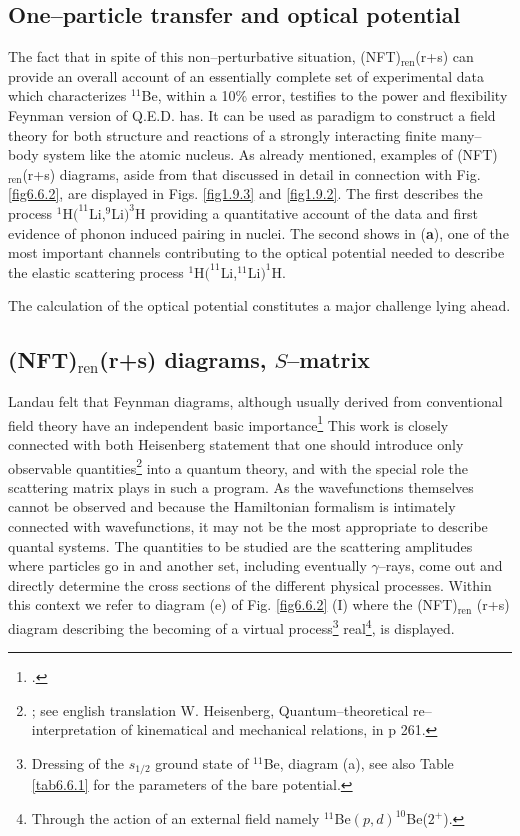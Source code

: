 \subsection{One--particle transfer and optical potential}
The fact that in spite of this non--perturbative situation, (NFT)$_{\text{ren}}$(r+s) can provide an overall account of an essentially complete set of experimental data which characterizes $^{11}$Be, within a 10\% error, testifies to the power and flexibility Feynman version of Q.E.D. has. It can be used as paradigm to construct a field theory for both structure and reactions of a strongly interacting finite many--body system like the atomic nucleus. As already mentioned, examples of (NFT)$_{\text{ren}}$(r+s) diagrams, aside from that discussed in detail in connection with Fig. \ref{fig6.6.2}, are displayed in Figs. \ref{fig1.9.3} and \ref{fig1.9.2}. The first describes the process  $^1$H$(^{11}$Li,$^9$Li$)^3$H providing a quantitative account of the data and first evidence of phonon induced pairing in nuclei. The second shows in (\textbf{a}), one of the most important channels contributing to the optical potential needed to describe the elastic scattering process $^1$H$(^{11}$Li,$^{11}$Li$)^1$H. 
    	    	 
The calculation of the optical potential constitutes a major challenge lying ahead.
\subsection{(NFT)$_{\text{ren}}$(r+s) diagrams, $S$--matrix}\label{S6.6.2}
Landau felt that Feynman diagrams, although usually derived from conventional field theory have an independent basic importance\footnote{\cite{Landau:59}.} This work is closely connected with both Heisenberg statement that one should introduce only observable quantities\footnote{\cite{Heisenberg:25}; see english translation W. Heisenberg, Quantum--theoretical re--interpretation of kinematical and mechanical relations, in \cite{VanderWaerden:67} p 261.} into a quantum theory, and with the special role the scattering matrix plays in such a program. As the wavefunctions themselves cannot be observed and because the Hamiltonian formalism is intimately connected with wavefunctions, it may not be the most appropriate to describe quantal systems. The quantities to be studied are the scattering amplitudes where particles go in and another set, including eventually $\gamma$--rays, come out and directly determine the cross sections of the different physical processes.
Within this context we refer to diagram (e) of Fig. \ref{fig6.6.2} (I) where the (NFT)$_{\text{ren}}$ (r+s) diagram describing the becoming of a virtual process\footnote{Dressing of the $s_{1/2}$ ground state of $^{11}$Be, diagram (a), see also Table \ref{tab6.6.1} for the parameters of the bare potential.} real\footnote{Through the action of an external field namely $^{11}$Be$(p,d)^{10}$Be($2^+$).},  is displayed.  
 



